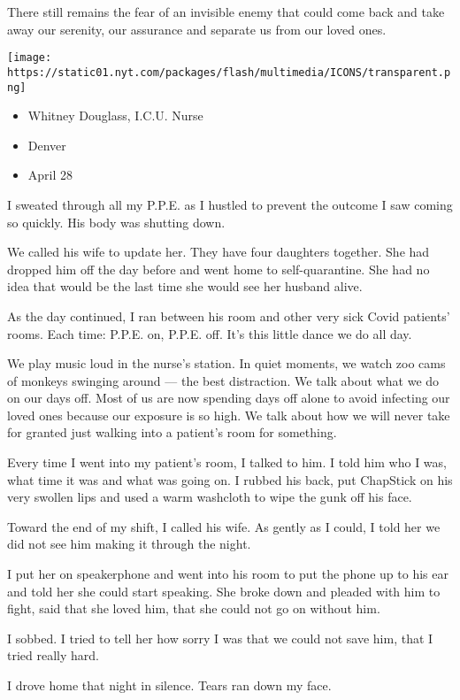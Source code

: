 There still remains the fear of an invisible enemy that could come back
and take away our serenity, our assurance and separate us from our loved
ones.

\texttt{[image: https://static01.nyt.com/packages/flash/multimedia/ICONS/transparent.png]}

\begin{itemize}
\tightlist
\item
  Whitney Douglass, I.C.U. Nurse
\item
  Denver
\item
  April 28
\end{itemize}

I sweated through all my P.P.E. as I hustled to prevent the outcome I
saw coming so quickly. His body was shutting down.

We called his wife to update her. They have four daughters together. She
had dropped him off the day before and went home to self-quarantine. She
had no idea that would be the last time she would see her husband alive.

As the day continued, I ran between his room and other very sick Covid
patients' rooms. Each time: P.P.E. on, P.P.E. off. It's this little
dance we do all day.

We play music loud in the nurse's station. In quiet moments, we watch
zoo cams of monkeys swinging around --- the best distraction. We talk
about what we do on our days off. Most of us are now spending days off
alone to avoid infecting our loved ones because our exposure is so high.
We talk about how we will never take for granted just walking into a
patient's room for something.

Every time I went into my patient's room, I talked to him. I told him
who I was, what time it was and what was going on. I rubbed his back,
put ChapStick on his very swollen lips and used a warm washcloth to wipe
the gunk off his face.

Toward the end of my shift, I called his wife. As gently as I could, I
told her we did not see him making it through the night.

I put her on speakerphone and went into his room to put the phone up to
his ear and told her she could start speaking. She broke down and
pleaded with him to fight, said that she loved him, that she could not
go on without him.

I sobbed. I tried to tell her how sorry I was that we could not save
him, that I tried really hard.

I drove home that night in silence. Tears ran down my face.

